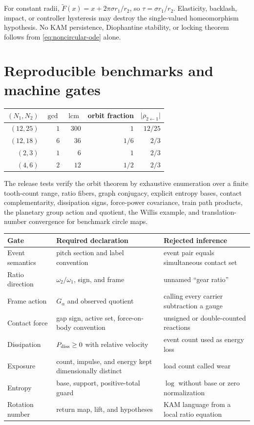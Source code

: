 \documentclass[11pt,a4paper]{article}
\theoremstyle{definition}
\theoremstyle{plain}
\theoremstyle{remark}
\begin{document}
For constant radii,
\(\widetilde F(x)=x+2\pi\sigma r_1/r_2\), so
\(\tau=\sigma r_1/r_2\). Elasticity, backlash, impact, or controller
hysteresis may destroy the single-valued homeomorphism hypothesis.
No KAM persistence, Diophantine stability, or locking theorem follows
from \cref{eq:noncircular-ode} alone.

\section{Reproducible benchmarks and machine gates}

\begin{center}
\begin{tabular}{rrrrr}
\toprule
\((N_1,N_2)\) & \(\gcd\) & \(\operatorname{lcm}\) &
orbit fraction & \(\lvert\rho_{2\leftarrow1}\rvert\)\\
\midrule
\((12,25)\) & \(1\) & \(300\) & \(1\) & \(12/25\)\\
\((12,18)\) & \(6\) & \(36\) & \(1/6\) & \(2/3\)\\
\((2,3)\) & \(1\) & \(6\) & \(1\) & \(2/3\)\\
\((4,6)\) & \(2\) & \(12\) & \(1/2\) & \(2/3\)\\
\bottomrule
\end{tabular}
\end{center}

The release tests verify the orbit theorem by exhaustive enumeration
over a finite tooth-count range, ratio fibers, graph conjugacy,
explicit entropy bases, contact complementarity, dissipation signs,
force-power covariance, train path products, the planetary group
action and quotient, the Willis example, and translation-number
convergence for benchmark circle maps.

\begin{longtable}{L{33mm}L{48mm}L{62mm}}
\toprule
Gate & Required declaration & Rejected inference\\
\midrule
\endhead
Event semantics & pitch section and label convention &
event pair equals simultaneous contact set\\
Ratio direction & \(\omega_2/\omega_1\), sign, and frame &
unnamed ``gear ratio''\\
Frame action & \(G_\alpha\) and observed quotient &
calling every carrier subtraction a gauge\\
Contact force & gap sign, active set, force-on-body convention &
unsigned or double-counted reactions\\
Dissipation & \(P_{\rm diss}\ge0\) with relative velocity &
event count used as energy loss\\
Exposure & count, impulse, and energy kept dimensionally distinct &
load count called wear\\
Entropy & base, support, positive-total guard &
\(\log\) without base or zero normalization\\
Rotation number & return map, lift, and hypotheses &
KAM language from a local ratio equation\\
\bottomrule
\end{longtable}
\end{document}
